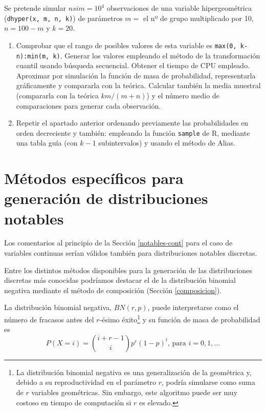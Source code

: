 \documentclass[
]{book}
\theoremstyle{break}
\theoremstyle{definition}
\theoremstyle{definition}
\theoremstyle{definition}
\theoremstyle{remark}
\begin{document}
Se pretende simular \(nsim=10^{4}\) observaciones de una variable
hipergeométrica (\texttt{dhyper(x,\ m,\ n,\ k)}) de parámetros \(m=\) el nº
de grupo multiplicado por 10, \(n=100-m\) y \(k=20\).

\begin{enumerate}
\def\labelenumi{\alph{enumi})}
\item
  Comprobar que el rango de posibles valores de esta variable es
  \texttt{max(0,\ k-n):min(m,\ k)}. Generar los valores empleando el método
  de la transformación cuantil usando búsqueda secuencial. Obtener
  el tiempo de CPU empleado. Aproximar por simulación la función
  de masa de probabilidad, representarla gráficamente y compararla
  con la teórica. Calcular también la media muestral (compararla
  con la teórica \(km/(m+n)\)) y el número medio de comparaciones
  para generar cada observación.
\item
  Repetir el apartado anterior ordenando previamente las
  probabilidades en orden decreciente y también: empleando la
  función \texttt{sample} de R, mediante una tabla guía (con
  \(k-1\) subintervalos) y usando el método de Alias.
\end{enumerate}

\hypertarget{notables-disc}{%
\section{Métodos específicos para generación de distribuciones notables}\label{notables-disc}}

Los comentarios al principio de la Sección \ref{notables-cont} para el caso de variables continuas serían válidos también para distribuciones notables discretas.

Entre los distintos métodos disponibles para la generación de las distribuciones discretas más conocidas podríamos destacar el de la distribución binomial negativa mediante el método de composición (Sección \ref{composicion}).

La distribución binomial negativa, \(BN(r, p)\), puede interpretarse como el número de fracasos antes del \(r\)-ésimo éxito\footnote{La distribución binomial negativa es una generalización de la geométrica y, debido a su reproductividad en el parámetro \(r\), podría simularse como suma de \(r\) variables geométricas. Sin embargo, este algoritmo puede ser muy costoso en tiempo de computación si \(r\) es elevado.} y su función de masa de probabilidad es
\[P(X = i) = \binom{i+r-1}i p^r (1-p)^i \text{, para }i=0,1,\ldots\]
\end{document}

